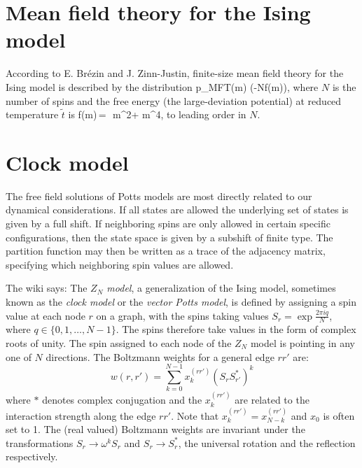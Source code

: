 \section{Mean field theory for the Ising model}
\label{sect:MFT-Ising}

According to E. Br{\'e}zin and J. Zinn-Justin,
finite-size mean field theory for the Ising model
is described by the distribution
\beq
p_{\rm MFT}(m)\,\propto\,\exp\left(-Nf(m)\right),
where $N$ is the number of spins and the free energy (the large-deviation
potential) at reduced temperature $\tilde{t}$ is
\beq
f(m)\,=\, \,m^2+ m^4,
to leading order in $N$.


\section{Clock model}
\label{sect:clock}

The 
{free field solutions} of Potts models are most directly related to our
dynamical considerations. If all states are allowed the underlying set of
states is given by a full shift. If neighboring spins are only allowed in
certain specific configurations, then the state space is given by a
subshift of finite type. The partition function may then be written as a
trace of the adjacency matrix, specifying which neighboring spin values
are allowed.

The  {wiki} says:
The \emph{$Z_N$ model}, a generalization of the Ising model, sometimes
known as the \emph{clock model} or the \emph{vector Potts model}, is
defined by assigning a spin value at each node $r$ on a graph, with the
spins taking values $S_r=\exp{\frac{2\pi i q}{N}}$, where $q\in
\{0,1,\ldots,N-1\}$. The spins therefore take values in the form of
complex roots of unity. The spin assigned to each node of the $Z_N$ model
is pointing in any one of $N$ directions. The Boltzmann weights for a
general edge $rr'$ are:
\[
w\left(r,r'\right)
=\sum_{k=0}^{N-1}x_{k}^{\left(rr'\right)}\left(S_{r}S_{r'}^*\right)^k
\]
where $*$ denotes complex conjugation and the $x_{k}^{\left(rr'\right)}$
are related to the interaction strength along the edge $rr'$. Note that
$x_{k}^{\left(rr'\right)}=x_{N-k}^{\left(rr'\right)}$ and $x_0$ is often
set to 1. The (real valued) Boltzmann weights are invariant under the
transformations $S_r \rightarrow \omega^k S_r$ and $S_r \rightarrow
S^{*}_{r}$, the universal rotation and the reflection respectively.

